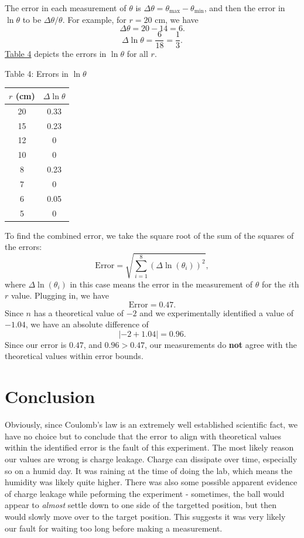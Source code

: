 \documentclass[11pt, letterpaper]{report}
\begin{document}
The error in each measurement of $\theta $ is $\Delta \theta =\theta_{\text{max}}-\theta _{\text{min}}$, and then the error in $\ln \theta $ to be $\Delta \theta /\theta $. For example, for $r=20$ cm, we have
\[
	\Delta \theta =20-14=6
.\]
\[
	\Delta \ln \theta = \frac{6}{18}=\frac{1}{3}
.\]
\hyperref[tab:4]{Table 4} depicts the errors in $\ln \theta $ for all $r$.
\begin{center}
	Table 4: Errors in $\ln \theta $\\\vspace*{5pt}
	\begin{tabular}{c|c}
		$r$ (cm)&$\Delta \ln \theta $ \\
		\hline
		20&0.33\\
		15&0.23\\
		12&0\\
		10&0\\
		8&0.23\\
		7&0\\
		6&0.05\\
		5&0
	\end{tabular}
\end{center}
To find the combined error, we take the square root of the sum of the squares of the errors:
\[
	\text{Error}=\sqrt{\sum_{i=1}^{8} \left( \Delta \ln (\theta_i) \right) ^2}
,\]
where $\Delta \ln (\theta _i)$ in this case means the error in the measurement of $\theta $ for the $i$th $r$ value. Plugging in, we have
\[
	\text{Error}=0.47
.\]
Since $n$ has a theoretical value of $-2$ and we experimentally identified a value of $-1.04$, we have an absolute difference of
\[
	\left| -2 +1.04\right| =0.96
.\]
Since our error is $0.47$, and $0.96>0.47$, our measurements do \textbf{not} agree with the theoretical values within error bounds.
\section{Conclusion}
Obviously, since Coulomb's law is an extremely well established scientific fact, we have no choice but to conclude that the error to align with theoretical values within the identified error is the fault of this experiment. The most likely reason our values are wrong is charge leakage. Charge can dissipate over time, especially so on a humid day. It was raining at the time of doing the lab, which means the humidity was likely quite higher. There was also some possible apparent evidence of charge leakage while peforming the experiment - sometimes, the ball would appear to \emph{almost} settle down to one side of the targetted position, but then would slowly move over to the target position. This suggests it was very likely our fault for waiting too long before making a measurement.
\end{document}
